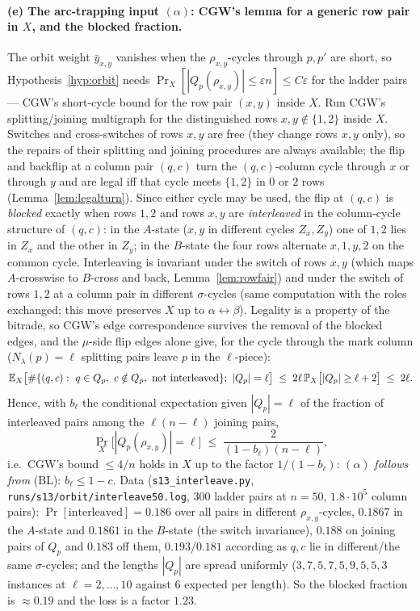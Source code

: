 \paragraph{(e) The arc-trapping input $(\alpha)$: CGW's lemma for a
generic row pair in $X$, and the blocked fraction.}  The orbit weight
$\bar y_{x,y}$ vanishes when the $\rho_{x,y}$-cycles through $p,p'$
are short, so Hypothesis~\ref{hyp:orbit} needs
$\Pr_X[|Q_p(\rho_{x,y})|\le\varepsilon n]\le C\varepsilon$ for the
ladder pairs --- CGW's short-cycle bound for the row pair $(x,y)$
inside $X$.  Run CGW's splitting/joining multigraph for the
distinguished rows $x,y\notin\{1,2\}$ inside $X$.  Switches and
cross-switches of rows $x,y$ are free (they change rows $x,y$ only),
so the repairs of their splitting and joining procedures are always
available; the flip and backflip at a column pair $(q,c)$ turn the
$(q,c)$-column cycle through $x$ or through $y$ and are legal iff
that cycle meets $\{1,2\}$ in $0$ or $2$ rows
(Lemma~\ref{lem:legalturn}).  Since either cycle may be used, the
flip at $(q,c)$ is \emph{blocked} exactly when rows $1,2$ and rows
$x,y$ are \emph{interleaved} in the column-cycle structure of $(q,c)$:
in the $A$-state ($x,y$ in different cycles $Z_x,Z_y$) one of $1,2$
lies in $Z_x$ and the other in $Z_y$; in the $B$-state the four rows
alternate $x,1,y,2$ on the common cycle.  Interleaving is invariant
under the switch of rows $x,y$ (which maps $A$-crosswise to $B$-cross
and back, Lemma~\ref{lem:rowfair}) and under the switch of rows $1,2$
at a column pair in different $\sigma$-cycles (same computation with
the roles exchanged; this move preserves $X$ up to $\alpha\leftrightarrow\beta$).
Legality is a property of the bitrade, so CGW's edge correspondence
survives the removal of the blocked edges, and the $\mu$-side flip
edges alone give, for the cycle through the mark column
($N_\lambda(p)=\ell$ splitting pairs leave $p$ in the $\ell$-piece):
\begin{equation}\label{eq:Jp}
\mathbb{E}_X\bigl[\#\{(q,c):\ q\in Q_p,\ c\notin Q_p,\ \text{not interleaved}\};\ |Q_p|=\ell\bigr]
\;\le\;2\ell\,\mathbb{P}_X\bigl[|Q_p|\ge\ell+2\bigr]\;\le\;2\ell .
\end{equation}
Hence, with $b_\ell$ the conditional expectation given $|Q_p|=\ell$ of
the fraction of interleaved pairs among the $\ell(n-\ell)$ joining
pairs,
\[
\Pr_X\bigl[|Q_p(\rho_{x,y})|=\ell\bigr]\;\le\;\frac{2}{(1-b_\ell)(n-\ell)} ,
\]
i.e.\ CGW's bound $\le 4/n$ holds in $X$ up to the factor
$1/(1-b_\ell)$: $(\alpha)$ \emph{follows from} (BL): $b_\ell\le1-c$.
Data (\texttt{s13\_interleave.py}, \texttt{runs/s13/orbit/interleave50.log},
$300$ ladder pairs at $n=50$, $1.8\cdot10^5$ column pairs):
$\Pr[\text{interleaved}]=0.186$ over all pairs in different
$\rho_{x,y}$-cycles, $0.1867$ in the $A$-state and $0.1861$ in the
$B$-state (the switch invariance), $0.188$ on joining pairs of $Q_p$
and $0.183$ off them, $0.193$/$0.181$ according as $q,c$ lie in
different/the same $\sigma$-cycles; and the lengths $|Q_p|$ are
spread uniformly ($3,7,5,7,5,9,5,5,3$ instances at
$\ell=2,\dots,10$ against $6$ expected per length).  So the blocked
fraction is $\approx0.19$ and the loss is a factor $1.23$.

